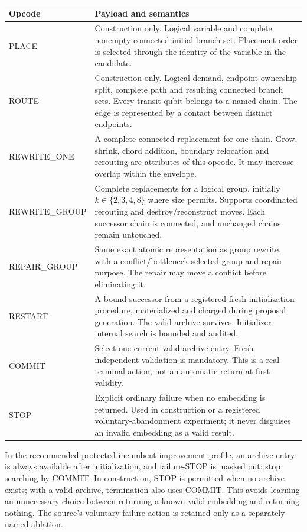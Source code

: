 \documentclass[11pt,a4paper]{article}
\theoremstyle{definition}\newtheorem{definition}[proposition]{Definition}
\begin{document}
{\small\begin{longtable}{@{}P{.20\textwidth}P{.73\textwidth}@{}}
\toprule
Opcode & Payload and semantics\\\midrule\endhead
PLACE & Construction only. Logical variable and complete nonempty connected initial branch set. Placement order is selected through the identity of the variable in the candidate.\\
ROUTE & Construction only. Logical demand, endpoint ownership split, complete path and resulting connected branch sets. Every transit qubit belongs to a named chain. The edge is represented by a contact between distinct endpoints.\\
REWRITE\_ONE & A complete connected replacement for one chain. Grow, shrink, chord addition, boundary relocation and rerouting are attributes of this opcode. It may increase overlap within the envelope.\\
REWRITE\_GROUP & Complete replacements for a logical group, initially $k\in\{2,3,4,8\}$ where size permits. Supports coordinated rerouting and destroy/reconstruct moves. Each successor chain is connected, and unchanged chains remain untouched.\\
REPAIR\_GROUP & Same exact atomic representation as group rewrite, with a conflict/bottleneck-selected group and repair purpose. The repair may move a conflict before eliminating it.\\
RESTART & A bound successor from a registered fresh initialization procedure, materialized and charged during proposal generation. The valid archive survives. Initializer-internal search is bounded and audited.\\
COMMIT & Select one current valid archive entry. Fresh independent validation is mandatory. This is a real terminal action, not an automatic return at first validity.\\
STOP & Explicit ordinary failure when no embedding is returned. Used in construction or a registered voluntary-abandonment experiment; it never disguises an invalid embedding as a valid result.\\
\bottomrule
\end{longtable}}

In the recommended protected-incumbent improvement profile, an archive entry is always available after initialization, and failure-STOP is masked out: stop searching by COMMIT. In construction, STOP is permitted when no archive exists; with a valid archive, termination also uses COMMIT. This avoids learning an unnecessary choice between returning a known valid embedding and returning nothing. The source's voluntary failure action is retained only as a separately named ablation.
\end{document}
